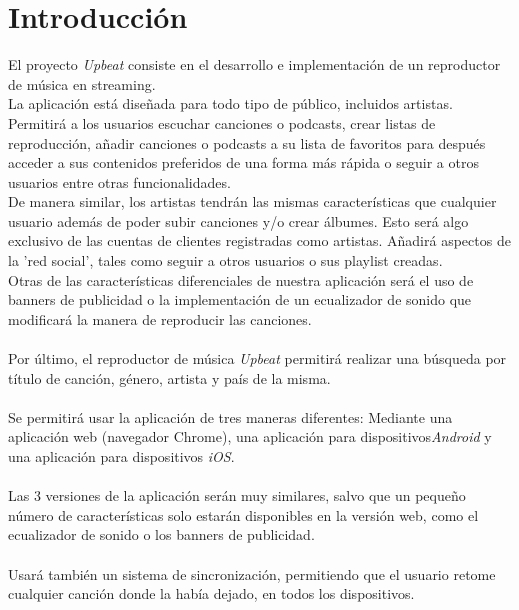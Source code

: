 \documentclass{article}
\begin{document}
\maketitle
\newpage
\section*{Introducción}
El proyecto \textit{Upbeat} consiste en el desarrollo e implementación de un reproductor de música en streaming.\\
\hfill \break
La aplicación está diseñada para todo tipo de público, incluidos artistas. Permitirá a los usuarios escuchar canciones o podcasts, crear listas de reproducción, añadir canciones o podcasts a su lista de favoritos para después acceder a sus contenidos preferidos de una forma más rápida o seguir a otros usuarios entre otras funcionalidades.
\hfill \break\\
De manera similar, los artistas tendrán las mismas características que cualquier usuario además de poder subir canciones y/o crear álbumes. Esto será algo exclusivo de las cuentas de clientes registradas como artistas.
\hfill \break
Añadirá aspectos de la 'red social', tales como seguir a otros usuarios o sus playlist creadas.\\
\hfill \break
Otras de las características diferenciales de nuestra aplicación será el uso de banners de publicidad o la implementación de un ecualizador de sonido que modificará la manera de reproducir las canciones.\\\\
Por último, el reproductor de música \textit{Upbeat} permitirá realizar una búsqueda por título de canción, género, artista y país de la misma.\\\\
Se permitirá usar la aplicación de tres maneras diferentes: Mediante una aplicación web (navegador Chrome), una aplicación para dispositivos\textit{Android} y una aplicación para dispositivos \textit{iOS}.\\\\
Las 3 versiones de la aplicación serán muy similares, salvo que un pequeño número de características solo estarán disponibles en la versión web, como el ecualizador de sonido o los banners de publicidad. \\\\
Usará también un sistema de sincronización, permitiendo que el usuario retome cualquier canción donde la había dejado, en todos los dispositivos.
\end{document}
